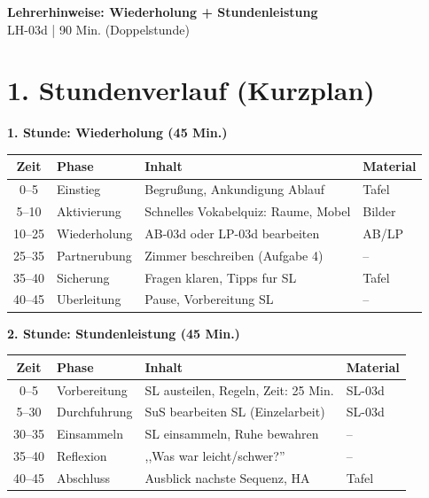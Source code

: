 \documentclass[11pt, a4paper]{article}
\newcommand{\fachfarbe}{spanisch}
\newcommand{\thema}{Wiederholung + Stundenleistung}
\newcommand{\sequenz}{03}
\newcommand{\block}{d}
\newcommand{\dauer}{90 Min. (Doppelstunde)}
\begin{document}

\begin{center}
    {\Large\bfseries\textcolor{\fachfarbe}{Lehrerhinweise: \thema}}\\[0.3em]
    {\normalsize LH-\sequenz\block{} | \dauer}
\end{center}

\vspace{10pt}


\section*{1. Stundenverlauf (Kurzplan)}

\textbf{1. Stunde: Wiederholung (45 Min.)}

\begin{tabularx}{\textwidth}{|c|l|X|l|}
\hline
\textbf{Zeit} & \textbf{Phase} & \textbf{Inhalt} & \textbf{Material} \\
\hline
0--5 & Einstieg & Begrußung, Ankun\-digung Ablauf & Tafel \\
\hline
5--10 & Aktivierung & Schnelles Vokabelquiz: Raume, Mobel & Bilder \\
\hline
10--25 & Wiederholung & AB-03d oder LP-03d bearbeiten & AB/LP \\
\hline
25--35 & Partnerubung & Zimmer beschreiben (Aufgabe 4) & -- \\
\hline
35--40 & Sicherung & Fragen klaren, Tipps fur SL & Tafel \\
\hline
40--45 & Uberleitung & Pause, Vorbereitung SL & -- \\
\hline
\end{tabularx}

\vspace{1em}

\textbf{2. Stunde: Stundenleistung (45 Min.)}

\begin{tabularx}{\textwidth}{|c|l|X|l|}
\hline
\textbf{Zeit} & \textbf{Phase} & \textbf{Inhalt} & \textbf{Material} \\
\hline
0--5 & Vorbereitung & SL austeilen, Regeln, Zeit: 25 Min. & SL-03d \\
\hline
5--30 & Durchfuhrung & SuS bearbeiten SL (Einzelarbeit) & SL-03d \\
\hline
30--35 & Einsammeln & SL einsammeln, Ruhe bewahren & -- \\
\hline
35--40 & Reflexion & ,,Was war leicht/schwer?'' & -- \\
\hline
40--45 & Abschluss & Ausblick nachste Sequenz, HA & Tafel \\
\hline
\end{tabularx}
\end{document}
